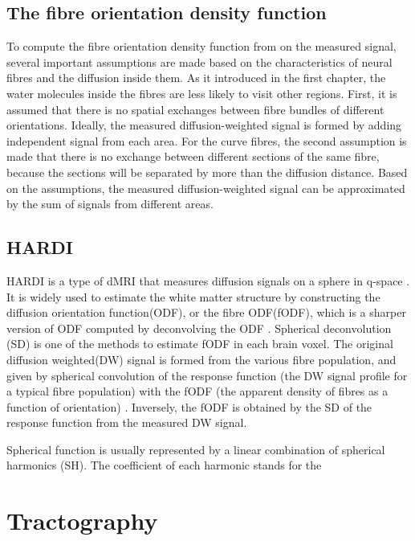 \subsection{The fibre orientation density function}
To compute the fibre orientation density function from on the measured signal, several important assumptions are made based on the characteristics of neural fibres and the diffusion inside them. 
As it introduced in the first chapter, the water molecules inside the fibres are less likely to visit other regions. First, it is assumed that there is 
no spatial exchanges between fibre bundles of different orientations. Ideally, the measured diffusion-weighted signal is formed by adding
independent signal from each area. For the curve fibres, the second assumption is made that there is no exchange between different sections of the same fibre, because
the sections will be separated by more than the diffusion distance. Based on the assumptions, the measured diffusion-weighted signal can be approximated by the sum of signals from 
different areas.


\subsection{HARDI}
HARDI is a type of dMRI that measures diffusion signals on a sphere in q-space \cite{consagraOptimizedDiffusionImaging2022}.
It is widely used to estimate the white matter structure by constructing the diffusion orientation function(ODF), or the fibre ODF(fODF), which is 
a sharper version of ODF computed by deconvolving the ODF \cite{descoteauxDeterministicProbabilisticTractography2009}. 
Spherical deconvolution (SD) is one of the methods to estimate fODF in each brain voxel. The original diffusion weighted(DW) signal is formed from the
various fibre population, and given by spherical convolution of the response function (the DW signal profile for a typical fibre population) 
with the fODF (the apparent density of fibres as a function of orientation) \cite{jeurissenMultitissueConstrainedSpherical2014}. 
Inversely, the fODF is obtained by the SD of the response function from the measured DW signal.

Spherical function is usually represented by a linear combination of spherical harmonics (SH). The coefficient of each harmonic stands for the 


\section{Tractography}

